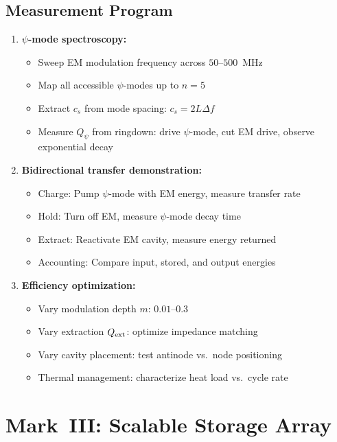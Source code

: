 \documentclass[11pt,a4paper]{article}
\begin{document}
\subsection{Measurement Program}

\begin{enumerate}
\item \textbf{$\psi$-mode spectroscopy:}
  \begin{itemize}
  \item Sweep EM modulation frequency across $50$--$500$~MHz
  \item Map all accessible $\psi$-modes up to $n = 5$
  \item Extract $c_s$ from mode spacing: $c_s = 2L\Delta f$
  \item Measure $Q_\psi$ from ringdown: drive $\psi$-mode, cut EM drive,
    observe exponential decay
  \end{itemize}

\item \textbf{Bidirectional transfer demonstration:}
  \begin{itemize}
  \item Charge: Pump $\psi$-mode with EM energy, measure transfer rate
  \item Hold: Turn off EM, measure $\psi$-mode decay time
  \item Extract: Reactivate EM cavity, measure energy returned
  \item Accounting: Compare input, stored, and output energies
  \end{itemize}

\item \textbf{Efficiency optimization:}
  \begin{itemize}
  \item Vary modulation depth $m$: $0.01$--$0.3$
  \item Vary extraction $Q_{\rm ext}$: optimize impedance matching
  \item Vary cavity placement: test antinode vs.\ node positioning
  \item Thermal management: characterize heat load vs.\ cycle rate
  \end{itemize}
\end{enumerate}

\section{Mark~III: Scalable Storage Array}
\end{document}
